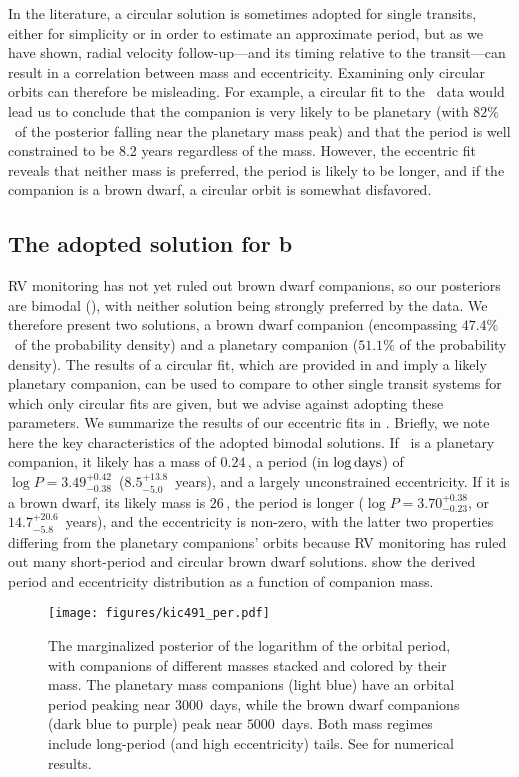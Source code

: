 \documentclass[twocolumn]{aastex63}
\begin{document}
In the literature, a circular solution is sometimes adopted for single transits, either for simplicity or in order to estimate an approximate period, but as we have shown, radial velocity follow-up---and its timing relative to the transit---can result in a correlation between mass and eccentricity. Examining only circular orbits can therefore be misleading. For example, a circular fit to the \thisstar\ data would lead us to conclude that the companion is very likely to be planetary (with $82\%$\ of the posterior falling near the planetary mass peak) and that the period is well constrained to be 8.2 years regardless of the mass. However, the eccentric fit reveals that neither mass is preferred, the period is likely to be longer, and if the companion is a brown dwarf, a circular orbit is somewhat disfavored.


\subsection{The adopted solution for \thisstar b}

RV monitoring has not yet ruled out brown dwarf companions, so our posteriors are bimodal (), with neither solution being strongly preferred by the data. We therefore present two solutions, a brown dwarf companion (encompassing $47.4\%$\ of the probability density) and a planetary companion ($51.1\%$ of the probability density). 
The results of a circular fit, which are provided in  and imply a likely planetary companion, can be used to compare to other single transit systems for which only circular fits are given, but we advise against adopting these parameters. We summarize the results of our eccentric fits in . Briefly, we note here the key characteristics of the adopted bimodal solutions. If \thisstarb\ is a planetary companion, it likely has a mass of $0.24$\,\mjup, a period (in $\log{\rm days}$) of $\log{P}=3.49^{+0.42}_{-0.38}$\ ($8.5^{+13.8}_{-5.0}$\ years), and a largely unconstrained eccentricity. If it is a brown dwarf, its likely mass is $26$\,\mjup, the period is longer ($\log{P}=3.70^{+0.38}_{-0.23}$, or $14.7^{+20.6}_{-5.8}$\ years), and the eccentricity is non-zero, with the latter two properties differing from the planetary companions' orbits because RV monitoring has ruled out many short-period and circular brown dwarf solutions.  show the derived period and eccentricity distribution as a function of companion mass.

\begin{figure}[!t]
    \centering
    \texttt{[image: figures/kic491\_per.pdf]}
    \caption{The marginalized posterior of the logarithm of the orbital period, with companions of different masses stacked and colored by their mass. The planetary mass companions (light blue) have an orbital period peaking near $3000$\ days, while the brown dwarf companions (dark blue to purple) peak near $5000$\ days. Both mass regimes include long-period (and high eccentricity) tails. See  for numerical results.}
    \label{fig:period}
\end{figure}
\end{document}
